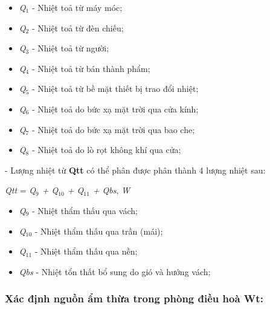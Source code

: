 \begin{itemize}[leftmargin = 3cm, label = $\ast$]
	\item \textit{Q$ _{1} $} - Nhiệt toả từ máy móc;
	
	\item \textit{Q$ _{2} $} - Nhiệt toả từ đèn chiếu;
	
	\item \textit{Q$ _{3} $} - Nhiệt toả từ người;
	
	\item \textit{Q$ _{4} $} - Nhiệt toả từ bán thành phẩm;
	
	\item \textit{Q$ _{5} $} - Nhiệt toả từ bề mặt thiết bị trao đổi nhiệt;
	
	\item \textit{Q$ _{6} $} - Nhiệt toả do bức xạ mặt trời qua cửa kính;
	
	\item \textit{Q$ _{7} $} - Nhiệt toả do bức xạ mặt trời qua bao che;
	
	\item \textit{Q$ _{8} $} - Nhiệt toả do lò rọt không khí qua cửa;
\end{itemize}

- Lượng nhiệt từ \textbf{Q{\footnotesize tt}} có thể phân được phân thành 4 lượng nhiệt sau:

\begin{center}
	\textit{Q{\footnotesize tt}} = \textit{Q$ _{9} $ + Q$ _{10} $ + Q$ _{11} $ + Q{\footnotesize bs}}, \textit{W}
\end{center}

\begin{itemize}[leftmargin = 3cm, label = $\ast$]
	\item \textit{Q$ _{9} $} - Nhiệt thẩm thấu qua vách;
	
	\item \textit{Q$ _{10} $} - Nhiệt thẩm thấu qua trần (mái);
	
	\item \textit{Q$ _{11} $} - Nhiệt thẩm thấu qua nền;
	
	\item \textit{Q{\footnotesize bs}} - Nhiệt tổn thất bổ sung do gió và hướng vách;
\end{itemize}


\subsubsection{Xác định nguồn ẩm thừa trong phòng điều hoà W{\footnotesize t}:}

